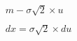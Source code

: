 \documentclass[preview]{standalone}
\begin{document}
\begin{align*}
m - \sigma \sqrt{2} \times u\\ \\dx = \sigma \sqrt{2} \times du\\ \\ \\ \\
\end{align*}
\end{document}
